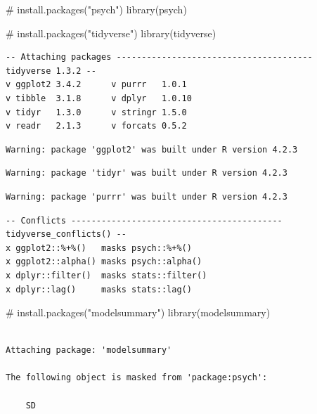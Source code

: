\documentclass[
  letterpaper,
  DIV=11,
  numbers=noendperiod]{scrartcl}
\newenvironment{Shaded}{\begin{snugshade}}{\end{snugshade}}
\newcommand{\CommentTok}[1]{\textcolor[rgb]{0.37,0.37,0.37}{#1}}
\newcommand{\FunctionTok}[1]{\textcolor[rgb]{0.28,0.35,0.67}{#1}}
\newcommand{\NormalTok}[1]{\textcolor[rgb]{0.00,0.23,0.31}{#1}}
\begin{document}
\begin{Shaded}
\begin{Highlighting}[]
\CommentTok{\# install.packages("psych")   }
\FunctionTok{library}\NormalTok{(psych)}

\CommentTok{\# install.packages("tidyverse")}
\FunctionTok{library}\NormalTok{(tidyverse)  }
\end{Highlighting}
\end{Shaded}

\begin{verbatim}
-- Attaching packages --------------------------------------- tidyverse 1.3.2 --
v ggplot2 3.4.2      v purrr   1.0.1 
v tibble  3.1.8      v dplyr   1.0.10
v tidyr   1.3.0      v stringr 1.5.0 
v readr   2.1.3      v forcats 0.5.2 
\end{verbatim}

\begin{verbatim}
Warning: package 'ggplot2' was built under R version 4.2.3
\end{verbatim}

\begin{verbatim}
Warning: package 'tidyr' was built under R version 4.2.3
\end{verbatim}

\begin{verbatim}
Warning: package 'purrr' was built under R version 4.2.3
\end{verbatim}

\begin{verbatim}
-- Conflicts ------------------------------------------ tidyverse_conflicts() --
x ggplot2::%+%()   masks psych::%+%()
x ggplot2::alpha() masks psych::alpha()
x dplyr::filter()  masks stats::filter()
x dplyr::lag()     masks stats::lag()
\end{verbatim}

\begin{Shaded}
\begin{Highlighting}[]
\CommentTok{\# install.packages("modelsummary")}
\FunctionTok{library}\NormalTok{(modelsummary)  }
\end{Highlighting}
\end{Shaded}

\begin{verbatim}

Attaching package: 'modelsummary'

The following object is masked from 'package:psych':

    SD
\end{verbatim}
\end{document}
